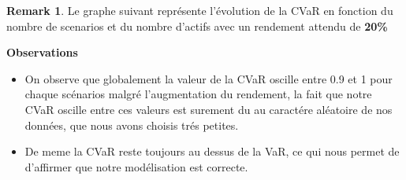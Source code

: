 \documentclass[12pt]{article}
\theoremstyle{definition}
\theoremstyle{definition}
\newtheorem*{remark}{Remark}
\begin{document}
\begin{remark}
Le graphe suivant représente l'évolution de la CVaR en fonction du nombre de scenarios et du nombre d'actifs avec un rendement attendu de \textbf{20\%}
\end{remark}

\begin{center}
        \textbf{Observations}
\end{center}
\begin{itemize}
\item On observe que globalement la valeur de la CVaR oscille entre 0.9 et 1 pour chaque scénarios malgré l'augmentation du rendement, la fait que notre CVaR oscille entre ces valeurs est surement du au caractére aléatoire de nos données, que nous avons choisis trés petites.
\item De meme la CVaR reste toujours au dessus de la VaR, ce qui nous permet de d'affirmer que notre modélisation est correcte.
\end{itemize}
\end{document}
